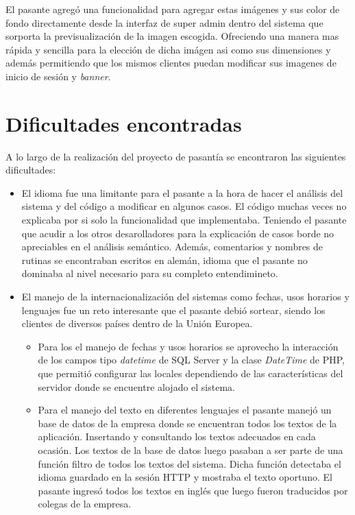 	El pasante agregó una funcionalidad para agregar estas imágenes y sus color de fondo directamente desde la interfaz de super admin dentro del sistema que sorporta la previsualización de la imagen escogida. Ofreciendo una manera mas rápida y sencilla para la elección de dicha imágen asi como sus dimensiones y además permitiendo que los mismos clientes puedan modificar sus imagenes de inicio de sesión y \emph{banner}. 


\section{Dificultades encontradas} %
\label{sec:dificultades_encontradas}

A lo largo de la realización del proyecto de pasantía se encontraron las siguientes dificultades:

\begin{itemize}
	\item El idioma fue una limitante para el pasante a la hora de hacer el análisis del sistema y del código a modificar en algunos casos. El código muchas veces no explicaba por si solo la funcionalidad que implementaba. Teniendo el pasante que acudir a los otros desarolladores para la explicación de casos borde no apreciables en el análisis semántico. Además, comentarios y nombres de rutinas se encontraban escritos en alemán, idioma que el pasante no dominaba al nivel necesario para su completo entendimineto.

	\item El manejo de la internacionalización del sistemas como fechas, usos horarios y lenguajes fue un reto interesante que el pasante debió sortear, siendo los clientes de diversos países dentro de la Unión Europea. 
	
	\begin{itemize}
		\item Para los el manejo de fechas y usos horarios se aprovecho la interacción de los campos tipo \emph{datetime} de SQL Server y la clase \emph{DateTime} de PHP, que permitió configurar las locales dependiendo de las características del servidor donde se encuentre alojado el sistema.

		\item Para el manejo del texto en diferentes lenguajes el pasante manejó un base de datos de la empresa donde se encuentran todos los textos de la aplicación. Insertando y consultando los textos adecuados en cada ocasión. Los textos de la base de datos luego pasaban a ser parte de una función filtro de todos los textos del sistema. Dicha función detectaba el idioma guardado en la sesión HTTP y mostraba el texto oportuno. El pasante ingresó todos los textos en inglés que luego fueron traducidos por colegas de la empresa.
	\end{itemize}

\end{itemize}




